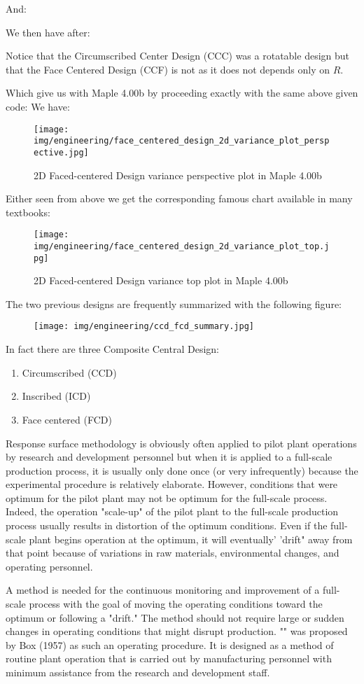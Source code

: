 	And:
	
	We then have after:
	
	Notice that the Circumscribed Center Design (CCC) was a rotatable design but that the Face Centered Design (CCF) is not as it does not depends only on $R$.
	
	Which give us with Maple 4.00b by proceeding exactly with the same above given code:
	We have:
	\begin{figure}[H]
		\centering
		\texttt{[image: img/engineering/face\_centered\_design\_2d\_variance\_plot\_perspective.jpg]}	
		\caption{2D Faced-centered Design variance perspective plot in Maple 4.00b}
	\end{figure}
	Either seen from above we get the corresponding famous chart available in many textbooks:
	\begin{figure}[H]
		\centering
		\texttt{[image: img/engineering/face\_centered\_design\_2d\_variance\_plot\_top.jpg]}	
		\caption{2D Faced-centered Design variance top plot in Maple 4.00b}
	\end{figure}
	The two previous designs are frequently summarized with the following figure:
	\begin{figure}[H]
		\centering
		\texttt{[image: img/engineering/ccd\_fcd\_summary.jpg]}	
	\end{figure}
	In fact there are three Composite Central Design:
	\begin{enumerate}
		\item Circumscribed (CCD)
		\item Inscribed (ICD)
		\item Face centered (FCD)
	\end{enumerate}
	Response surface methodology is obviously often applied to pilot plant operations by research and development personnel but when it is applied to a full-scale production process, it is usually only done once (or very infrequently) because the experimental procedure is relatively elaborate. However, conditions that were optimum for the pilot plant may not be optimum for the full-scale process. Indeed, the operation "scale-up" of the pilot plant to the full-scale production process usually results in distortion of the optimum conditions. Even if the full-scale plant begins operation at the optimum, it will eventually' 'drift" away from that point because of variations in raw materials, environmental changes, and operating personnel.

	A method is needed for the continuous monitoring and improvement of a full-scale process with the goal of moving the operating conditions toward the optimum or following a "drift." The method should not require large or sudden changes in operating conditions that might disrupt production. "" was proposed by Box (1957) as such an operating procedure. It is designed as a method of routine plant operation that is carried out by manufacturing personnel with minimum assistance from the research and development staff.
	
